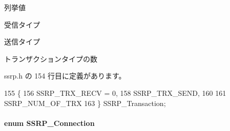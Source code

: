 \begin{Desc}
\item[列挙値]\par
\begin{description}
\item[{\em 
S\+S\+R\+P\+\_\+\+T\+R\+X\+\_\+\+R\+E\+C\+V\label{ssrp_8h_a97957e4b5b03d11a84ca43c725d2ec75_a97957e4b5b03d11a84ca43c725d2ec75a2133aaf05c96ed977f3a38f0e1b8a302}
}]受信タイプ \item[{\em 
S\+S\+R\+P\+\_\+\+T\+R\+X\+\_\+\+S\+E\+N\+D\label{ssrp_8h_a97957e4b5b03d11a84ca43c725d2ec75_a97957e4b5b03d11a84ca43c725d2ec75a501ebd9cc910ea5cf349e15f7c495404}
}]送信タイプ \item[{\em 
S\+S\+R\+P\+\_\+\+N\+U\+M\+\_\+\+O\+F\+\_\+\+T\+R\+X\label{ssrp_8h_a97957e4b5b03d11a84ca43c725d2ec75_a97957e4b5b03d11a84ca43c725d2ec75a48806600dd23a30a763927aeba5e6d4e}
}]トランザクションタイプの数 \end{description}
\end{Desc}


 ssrp.\+h の 154 行目に定義があります。


\begin{DoxyCode}
155 \{
156     SSRP_TRX_RECV = 0,
158     SSRP_TRX_SEND,
160 
161     SSRP_NUM_OF_TRX
163 \} SSRP_Transaction;    
\end{DoxyCode}
\paragraph[{S\+S\+R\+P\+\_\+\+Connection}]{\setlength{\rightskip}{0pt plus 5cm}enum {\bf S\+S\+R\+P\+\_\+\+Connection}}\label{ssrp_8h_a7dcaa29c248300ccd1e2b9932d59041e_a7dcaa29c248300ccd1e2b9932d59041e}


